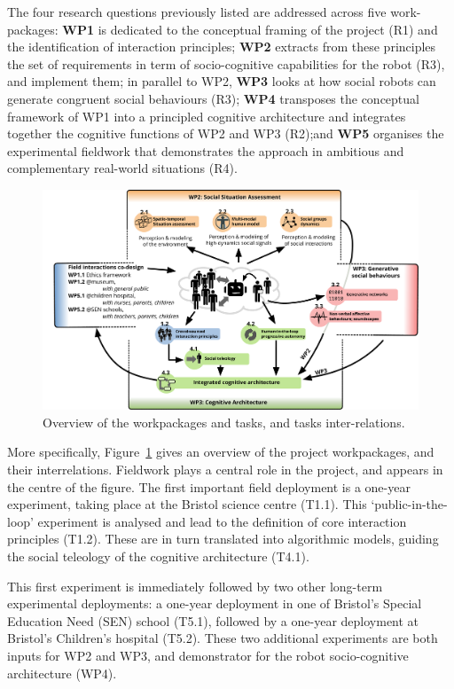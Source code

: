 
The four research questions previously listed are addressed across five
work-packages: \textbf{WP1} is dedicated to the conceptual framing of the
project (R1) and the identification of interaction principles; \textbf{WP2}
extracts from these principles the set of requirements in term of
socio-cognitive capabilities for the robot (R3), and implement them; in parallel
to WP2,  \textbf{WP3} looks at how social robots can generate congruent social
behaviours (R3); \textbf{WP4} transposes the conceptual framework of WP1 into a
principled cognitive architecture and integrates together the cognitive
functions of WP2 and WP3 (R2);and \textbf{WP5} organises the experimental
fieldwork that demonstrates the \project approach in ambitious and complementary
real-world situations (R4).



\begin{figure}[h!]
\centering
\includegraphics[width=\linewidth]{figs/wps}
\caption{Overview of the workpackages and tasks, and tasks inter-relations.}
\label{fig:wps}
\end{figure}

More specifically, Figure~\ref{fig:wps} gives an overview of the project
workpackages, and their interrelations. Fieldwork plays a central role in the
project, and appears in the centre of the figure. The first important field
deployment is a one-year experiment, taking place at the Bristol science centre
(T1.1). This `public-in-the-loop' experiment is analysed and lead to the
definition of core interaction principles (T1.2). These are in turn translated
into algorithmic models, guiding the social teleology of the cognitive
architecture (T4.1).

This first experiment is immediately followed by two other long-term
experimental deployments: a one-year deployment in one of Bristol's Special
Education Need (SEN) school (T5.1), followed by a one-year deployment at
Bristol's Children's hospital (T5.2). These two additional experiments are both
inputs for WP2 and WP3, and demonstrator for the robot socio-cognitive
architecture (WP4).

